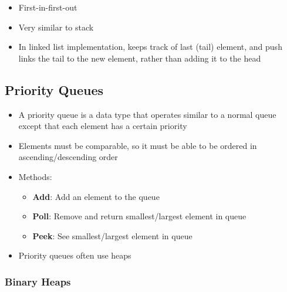 \documentclass{article}
\begin{document}
\begin{itemize}
    \item First-in-first-out
    \item Very similar to stack
    \item In linked list implementation, keeps track of last (tail) element, and push links the tail to the new element, rather than adding it to the head
\end{itemize}

\subsection{Priority Queues}

\begin{itemize}
    \item A priority queue is a data type that operates similar to a normal queue except that each element has a certain priority
    \item Elements must be comparable, so it must be able to be ordered in ascending/descending order 
    \item Methods:
    \begin{itemize}
        \item \textbf{Add}: Add an element to the queue
        \item \textbf{Poll}: Remove and return smallest/largest element in queue
        \item \textbf{Peek}: See smallest/largest element in queue
    \end{itemize}
    \item Priority queues often use heaps
\end{itemize}

\subsubsection{Binary Heaps}
\end{document}
